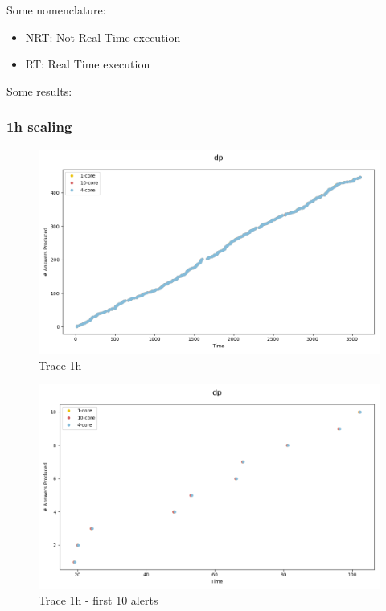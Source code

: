 \documentclass{article}
\begin{document}
Some nomenclature:
\begin{itemize}
  \item NRT: Not Real Time execution
  \item RT: Real Time execution
\end{itemize}

Some results:

\subsubsection{1h scaling}


\begin{figure}[H]
  \centering
  \includegraphics[scale = 0.5]{images/traces-1h.png}
  \caption{Trace 1h }
\end{figure}


\begin{figure}[H]
  \centering
  \includegraphics[scale = 0.5]{images/traces-1h-10.png}
  \caption{Trace 1h - first 10 alerts}
\end{figure}
\end{document}
